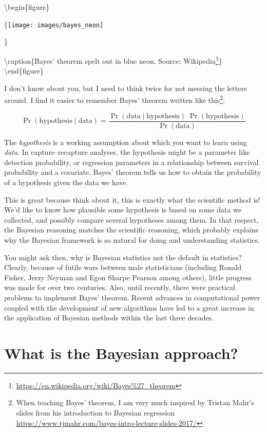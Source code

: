 \documentclass[
  12pt,
]{krantz}
\makeatletter
\renewcommand{\href}[2]{#2\footnote{\url{#1}}}
\newenvironment{kframe}{%
\medskip{}
\setlength{\fboxsep}{.8em}
 \def\at@end@of@kframe{}%
 \ifinner\ifhmode%
  \def\at@end@of@kframe{\end{minipage}}%
  \begin{minipage}{\columnwidth}%
 \fi\fi%
 \def\FrameCommand##1{\hskip\@totalleftmargin \hskip-\fboxsep
 \colorbox{shadecolor}{##1}\hskip-\fboxsep
     \hskip-\linewidth \hskip-\@totalleftmargin \hskip\columnwidth}%
 \MakeFramed {\advance\hsize-\width
   \@totalleftmargin\z@ \linewidth\hsize
   \@setminipage}}%
 {\par\unskip\endMakeFramed%
 \at@end@of@kframe}
\newenvironment{rmdblock}[1]
  {
  \begin{itemize}
  \renewcommand{\labelitemi}{
    \raisebox{-.7\height}[0pt][0pt]{
      {\setkeys{Gin}{width=3em,keepaspectratio}\texttt{[image: images/\#1]}}
    }
  }
  \setlength{\fboxsep}{1em}
  \begin{kframe}
  \item
  }
  {
  \end{kframe}
  \end{itemize}
  }
\newenvironment{rmdnote}
  {\begin{rmdblock}{note}}
  {\end{rmdblock}}
\makeatother
\begin{document}
\textbackslash begin\{figure\}

\{\centering \texttt{[image: images/bayes\_neon]}

\}

\textbackslash caption\{Bayes' theorem spelt out in blue neon. Source: \href{https://en.wikipedia.org/wiki/Bayes\%27_theorem}{Wikipedia}\}\label{fig:bayestheorem}
\textbackslash end\{figure\}

I don't know about you, but I need to think twice for not messing the letters around. I find it easier to remember Bayes' theorem written like this\footnote{When teaching Bayes' theorem, I am very much inspired by Tristan Mahr's slides from his introduction to Bayesian regression \url{https://www.tjmahr.com/bayes-intro-lecture-slides-2017/}}:

\[ \Pr(\text{hypothesis} \mid \text{data}) = \frac{ \Pr(\text{data} \mid \text{hypothesis}) \; \Pr(\text{hypothesis})}{\Pr(\text{data})} \]
\begin{rmdnote}
The \emph{hypothesis} is a working assumption about which you want to learn using \emph{data}. In capture--recapture analyses, the hypothesis might be a parameter like detection probability, or regression parameters in a relationship between survival probability and a covariate. Bayes' theorem tells us how to obtain the probability of a hypothesis given the data we have.
\end{rmdnote}

This is great because think about it, this is exactly what the scientific method is! We'd like to know how plausible some hypothesis is based on some data we collected, and possibly compare several hypotheses among them. In that respect, the Bayesian reasoning matches the scientific reasoning, which probably explains why the Bayesian framework is so natural for doing and understanding statistics.

You might ask then, why is Bayesian statistics not the default in statistics? Clearly, because of futile wars between male statisticians (including Ronald Fisher, Jerzy Neyman and Egon Sharpe Pearson among others), little progress was made for over two centuries. Also, until recently, there were practical problems to implement Bayes' theorem. Recent advances in computational power coupled with the development of new algorithms have led to a great increase in the application of Bayesian methods within the last three decades.

\hypertarget{what-is-the-bayesian-approach}{%
\section{What is the Bayesian approach?}\label{what-is-the-bayesian-approach}}
\end{document}
